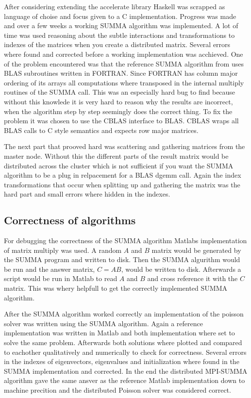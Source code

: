 \documentclass{article}
\begin{document}
After considering extending the accelerate library Haskell was scrapped as language of choise and
focus given to a C implementation. Progress was made and over a few weeks a working SUMMA algorithm
was implemented. A lot of time was used reasoning about the subtle interactions and transformations
to indexes of the matrices when you create a distributed matrix. Several errors where found and
corrected before a working implementation was acchieved. One of the problem encountered was that
the reference SUMMA algorithm from \cite{summa} uses BLAS subroutines written in FORTRAN.
Since FORTRAN has column major ordering
of its arrays all computations where transposed in the internal multiply routines of the SUMMA call.
This was an especially hard bug to find because without this knowlede it is very hard to reason
why the results are incorrect, when the algorithm step by step seemingly does the correct thing.
To fix the problem it was chosen to use the CBLAS interface to BLAS. CBLAS wraps all BLAS calls
to C style semantics and expects row major matrices.

The next part that prooved hard was scattering and gathering matrices from the master node.
Without this the different parts of the result matrix would be distributed across the cluster
which is not sufficient if you want the SUMMA algorithm to be a plug in relpacement for a
BLAS dgemm call. Again the index transformations that occur when splitting up and gathering
the matrix was the hard part and small errors where hidden in the indexes.

\subsection{Correctness of algorithms}
For debugging the correctness of the SUMMA algorithm Matlabs implementation of
matrix multiply was used. A random $A$ and $B$ matrix would be generated by the
SUMMA program and written to disk. Then the SUMMA algurithm would be run and the
answer matrix, $C = A B$, would be written to disk. Afterwards a script would be
run in Matlab to read $A$ and $B$ and cross reference it with the $C$ matrix.
This was whery helpfull to get the correctly implemented SUMMA algorithm.

After the SUMMA algorithm worked correctly an implementation of the poisson solver
was written using the SUMMA algorithm. Again a reference implementation was written
in Matlab and both implementation where set to solve the same problem. Afterwards
both solutions where plotted and compared to eachother qualitatively and numerically
to check for correctness. Several errors in the indexes of eigenvectors, eigenvalues
and initialization where found in the SUMMA implementation and corrected. In the end
the distributed MPI-SUMMA algorithm gave the same ansver as the reference Matlab implementation
down to machine precition and the distributed Poisson solver was considered correct.
\end{document}

